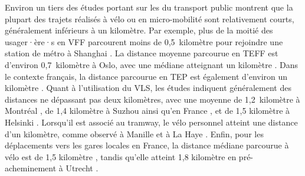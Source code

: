 \begin{refsegment}
Environ un tiers des études portant sur les  du transport public montrent que la plupart des trajets réalisés à vélo ou en micro-mobilité sont relativement courts, généralement inférieurs à un kilomètre. Par exemple, plus de la moitié des usager·ère·s en \acrshort{VFF} parcourent moins de 0,5~kilomètre pour rejoindre une station de métro à Shanghai \textcolor{blue}{\autocite[1422]{zhang_bicyclemetro_2019}}. La distance moyenne parcourue en \acrshort{TEFF} est d'environ 0,7~kilomètre à Oslo, avec une médiane atteignant un kilomètre \textcolor{blue}{\autocite[4]{fearnley_patterns_2020}}. Dans le contexte français, la distance parcourue en \acrshort{TEP} est également d'environ un kilomètre \textcolor{blue}{\autocite[62]{rabaud_quand_2022}}. Quant à l'utilisation du \acrshort{VLS}, les études indiquent généralement des distances ne dépassant pas deux kilomètres, avec une moyenne de 1,2~kilomètre à Montréal \textcolor{blue}{\autocite[479]{tarpin-pitre_typology_2020}}, de 1,4 kilomètre à Suzhou \textcolor{blue}{\autocite[11]{ma_measuring_2018}} ainsi qu'en France \textcolor{blue}{\autocite[62]{rabaud_quand_2022}}, et de 1,5 kilomètre à Helsinki \textcolor{blue}{\autocite[23]{jappinen_modelling_2013}}. Lorsqu'il est associé au tramway, le vélo personnel atteint une distance d'un kilomètre, comme observé à Manille \textcolor{blue}{\autocite[246]{fillone_i_2018}} et à La Haye \textcolor{blue}{\autocite[2]{rijsman_walking_2019}}. Enfin, pour les déplacements vers les gares locales en France, la distance médiane parcourue à vélo est de 1,5 kilomètre \textcolor{blue}{\autocite[15, 27]{hasiak_access_2019}}, tandis qu'elle atteint 1,8 kilomètre en pré-acheminement à Utrecht \textcolor{blue}{\autocite[268]{krygsman_multimodal_2004}}.%


\end{refsegment}
